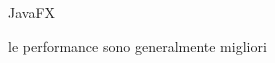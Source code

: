 \documentclass[%
]{beamer}
\begin{document}
\begin{frame}
\begin{columns}[onlytextwidth]
\begin{column}{.6\textwidth}
{\begin{block}{\centering JavaFX}
\begin{itemize}
                                      le performance sono generalmente migliori
                                \end{itemize}
                            \end{block}
                        }

\end{column}
\end{columns}
\end{frame}
\end{document}
